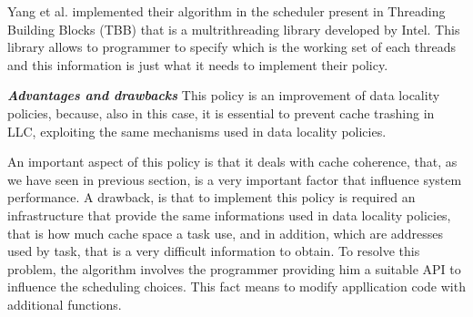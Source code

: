 \begin{description}
Yang et al. implemented their algorithm in the scheduler present in Threading Building Blocks (TBB) that is a multrithreading library developed by Intel. 
This library allows to programmer to specify which is the working set of each threads and this information is just what it needs to implement their policy. 


\textbf{\textit{Advantages and drawbacks}}
This policy is an improvement of data locality policies, because, also in this case, it is essential to prevent cache trashing in LLC,
exploiting the same mechanisms used in data locality policies.

An important aspect of this policy is that it deals with cache coherence, that, as we have seen in previous section, is a very important factor that 
influence system performance. A drawback, is that to implement this policy is required an infrastructure that provide the same informations used in 
data locality policies, that is how much cache space a task use, and in addition, which are addresses used by task, that is a very difficult information
to obtain. To resolve this problem, the algorithm involves the programmer providing him a suitable API to influence the scheduling choices. This fact 
means to modify appllication code with additional functions. 
\end{description}


